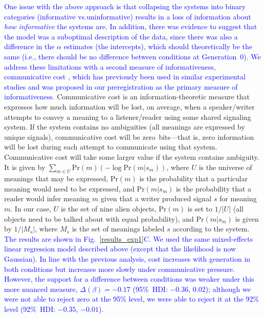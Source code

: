\documentclass[doc,biblatex]{apa7}
\newcommand\newmaterial[1]{\textcolor{blue}{#1}}
\begin{document}
\newmaterial{One issue with the above approach is that collapsing the systems into binary categories (informative vs.\@ uninformative) results in a loss of information about \textit{how informative} the systems are. In addition, there was evidence to suggest that the model was a suboptimal description of the data, since there was also a difference in the $\alpha$ estimates (the intercepts), which should theoretically be the same (i.e., there should be no difference between conditions at Generation~0). We address these limitations with a second measure of informativeness, communicative cost \parencite{KempRegier:2012, Kemp:2018, Regier:2015}, which has previously been used in similar experimental studies \parencite{Carr:2020, Carstensen:2015, Smith:2020} and was proposed in our preregistration as the primary measure of informativeness.} Communicative cost is an information-theoretic measure that expresses how much information will be lost, on average, when a speaker/writer attempts to convey a meaning to a listener/reader using some shared signaling system. If the system contains no ambiguities (all meanings are expressed by unique signals), communicative cost will be zero~bits---that is, zero information will be lost during each attempt to communicate using that system. Communicative cost will take some larger value if the system contains ambiguity. It is given by $\sum_{m \in U} \mathrm{Pr}(m) ( -\log \mathrm{Pr}(m|s_m) )$, where $U$ is the universe of meanings that may be expressed, $\mathrm{Pr}(m)$ is the probability that a particular meaning would need to be expressed, and $\mathrm{Pr}(m|s_m)$ is the probability that a reader would infer meaning $m$ given that a writer produced signal $s$ for meaning $m$. In our case, $U$ is the set of nine alien objects, $\mathrm{Pr}(m)$ is set to $1/|U|$ (all objects need to be talked about with equal probability), and $\mathrm{Pr}(m|s_m)$ is given by $1/|M_s|$, where $M_s$ is the set of meanings labeled $s$ according to the system. \newmaterial{The results are shown in Fig.~\ref{results_exp1}C. We used the same mixed-effects linear regression model described above (except that the likelihood is now Gaussian). In line with the previous analysis, cost increases with generation in both conditions but increases more slowly under communicative pressure. However, the support for a difference between conditions was weaker under this more nuanced measure, $\Delta(\beta) = -0.17$ (95\%~HDI: $-0.36$, $0.02$); although we were not able to reject zero at the 95\% level, we were able to reject it at the 92\% level (92\%~HDI: $-0.35$, $-0.01$).}
\end{document}
